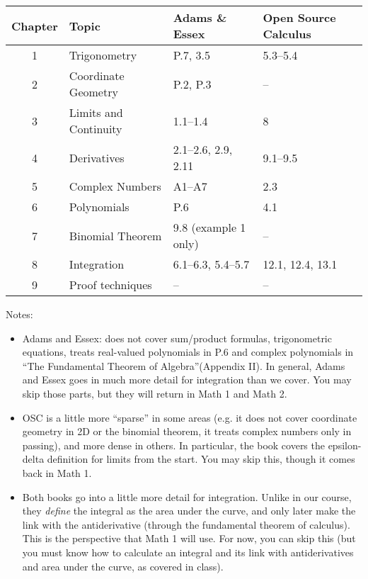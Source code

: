 \documentclass{article}
\begin{document}
\begin{tabular}{clll}
\toprule
\textbf{Chapter} & \textbf{Topic} & \textbf{Adams \& Essex} & \textbf{Open Source Calculus} \\
\midrule
1 & Trigonometry       & P.7, 3.5              & 5.3--5.4 \\
2 & Coordinate Geometry & P.2, P.3             & -- \\
3 & Limits and Continuity & 1.1--1.4           & 8 \\
4 & Derivatives        & 2.1--2.6, 2.9, 2.11   & 9.1--9.5 \\
5 & Complex Numbers    & A1--A7               & 2.3 \\
6 & Polynomials        & P.6                  & 4.1 \\
7 & Binomial Theorem   & 9.8 (example 1 only) & -- \\
8 & Integration        & 6.1--6.3, 5.4--5.7   & 12.1, 12.4, 13.1 \\
9 & Proof techniques   & --                   & -- \\
\bottomrule
\end{tabular}

Notes:

\begin{itemize}
\item Adams and Essex: does not cover sum/product formulas, trigonometric equations, treats real-valued polynomials in P.6 and complex polynomials in ``The Fundamental Theorem of Algebra''(Appendix II). In general, Adams and Essex goes in much more detail for integration than we cover. You may skip those parts, but they will return in Math 1 and Math 2.		

\item OSC is a little more ``sparse'' in some areas (e.g. it does not cover coordinate geometry in 2D or the binomial theorem, it treats complex numbers only in passing), and more dense in others. In particular, the book covers the epsilon-delta definition for limits from the start. You may skip this, though it comes back in Math 1.

\item Both books go into a little more detail for integration. Unlike in our course, they \emph{define} the integral as the area under the curve, and only later make the link with the antiderivative (through the fundamental theorem of calculus). This is the perspective that Math 1 will use. For now, you can skip this (but you must know how to calculate an integral and its link with antiderivatives and area under the curve, as covered in class).

\end{itemize}
\end{document}
